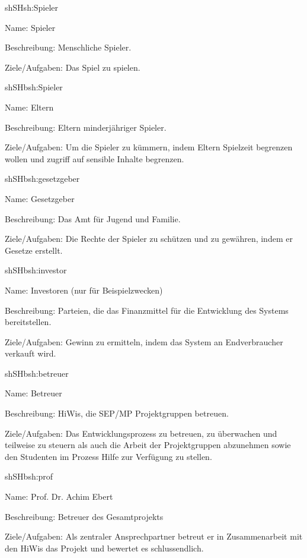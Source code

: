 \begin{description}[leftmargin=5em, style=sameline]
	
	\begin{lhp}{sh}{SH}{sh:Spieler}
		\item [Name:] Spieler
		\item [Beschreibung:] Menschliche Spieler.
		\item [Ziele/Aufgaben:] Das Spiel zu spielen.
	\end{lhp}
	
	\begin{lhp}{sh}{SH}{bsh:Spieler}
		\item [Name:] Eltern
		\item [Beschreibung:] Eltern minderjähriger Spieler.
		\item [Ziele/Aufgaben:] Um die Spieler zu kümmern, indem Eltern Spielzeit begrenzen wollen und zugriff auf sensible Inhalte begrenzen.
	\end{lhp}
	
	\begin{lhp}{sh}{SH}{bsh:gesetzgeber}
		\item [Name:] Gesetzgeber
		\item [Beschreibung:] Das Amt für Jugend und Familie.
		\item [Ziele/Aufgaben:] Die Rechte der Spieler zu schützen und zu gewähren, indem er Gesetze erstellt.
	\end{lhp}
	
	\begin{lhp}{sh}{SH}{bsh:investor}
		\item [Name:] Investoren (nur für Beispielzwecken)
		\item [Beschreibung:] Parteien, die das Finanzmittel für die Entwicklung des Systems bereitstellen.
		\item [Ziele/Aufgaben:] Gewinn zu ermitteln, indem das System an Endverbraucher verkauft wird.
	\end{lhp}
	
	\begin{lhp}{sh}{SH}{bsh:betreuer}
		\item [Name:] Betreuer
		\item [Beschreibung:] HiWis, die SEP/MP Projektgruppen betreuen.
		\item [Ziele/Aufgaben:] Das Entwicklungsprozess zu betreuen, zu überwachen und teilweise zu steuern als auch die Arbeit der Projektgruppen abzunehmen sowie den Studenten im Prozess Hilfe zur Verfügung zu stellen. 
	\end{lhp}
	
	\begin{lhp}{sh}{SH}{bsh:prof}
		\item [Name:] Prof. Dr. Achim Ebert
		\item [Beschreibung:] Betreuer des Gesamtprojekts 
		\item [Ziele/Aufgaben:] Als zentraler Ansprechpartner betreut er in Zusammenarbeit mit den HiWis das Projekt und bewertet es schlussendlich.
	\end{lhp}
		
\end{description}

